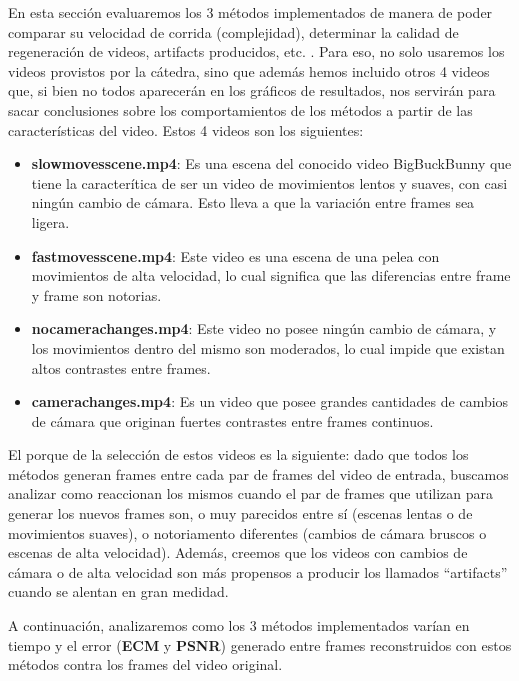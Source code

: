 En esta secci\'on evaluaremos los 3 m\'etodos implementados de manera de poder comparar su velocidad de corrida (complejidad), determinar la calidad de regeneraci\'on de videos, artifacts producidos, etc. . Para eso, no solo usaremos los videos provistos por la c\'atedra, sino que adem\'as hemos incluido otros 4 videos que, si bien no todos aparecer\'an en los gr\'aficos de resultados, nos servir\'an para sacar conclusiones sobre los comportamientos de los m\'etodos a partir de las caracter\'isticas del video. Estos 4 videos son los siguientes:

\begin{itemize}
\item \textbf{slowmovesscene.mp4}: Es una escena del conocido video BigBuckBunny que tiene la caracter\'itica de ser un video de movimientos lentos y suaves, con casi ning\'un cambio de c\'amara. Esto lleva a que la variaci\'on entre frames sea ligera. 
\item \textbf{fastmovesscene.mp4}: Este video es una escena de una pelea con movimientos de alta velocidad, lo cual significa que las diferencias entre frame y frame son notorias.
\item \textbf{nocamerachanges.mp4}: Este video no posee ning\'un cambio de c\'amara, y los movimientos dentro del mismo son moderados, lo cual impide que existan altos contrastes entre frames.
\item \textbf{camerachanges.mp4}: Es un video que posee grandes cantidades de cambios de c\'amara que originan fuertes contrastes entre frames continuos.
\end{itemize}

El porque de la selecci\'on de estos videos es la siguiente: dado que todos los m\'etodos generan frames entre cada par de frames del video de entrada, buscamos analizar como reaccionan los mismos cuando el par de frames que utilizan para generar los nuevos frames son, o muy parecidos entre s\'i (escenas lentas o de movimientos suaves), o notoriamento diferentes (cambios de c\'amara bruscos o escenas de alta velocidad). Adem\'as, creemos que los videos con cambios de c\'amara o de alta velocidad son m\'as propensos a producir los llamados ``artifacts'' cuando se alentan en gran medidad. 

A continuaci\'on, analizaremos como los 3 m\'etodos implementados var\'ian en tiempo y el error (\textbf{ECM} y \textbf{PSNR}) generado entre frames reconstruidos con estos m\'etodos contra los frames del video original.